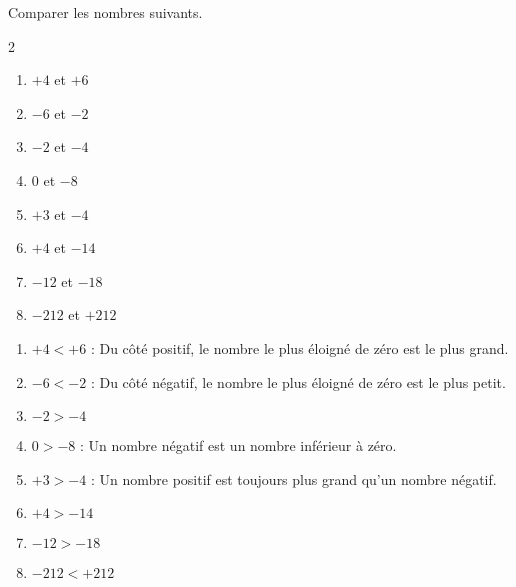 \begin{exercice*}
    Comparer les nombres suivants.
    \begin{multicols}2
        \begin{enumerate}
            \item $+4$ et $+6$
            \item $-6$ et $-2$
            \item $-2$ et $-4$
            \item $0$ et $-8$
            \item $+3$ et $-4$
            \item $+4$ et $-14$
            \item $-12$ et $-18$
            \item $-212$ et $+212$
        \end{enumerate}
    \end{multicols}
\end{exercice*}
\begin{corrige}
    \phantom{rrr}    
    
    \begin{enumerate}
        \item $+4<+6$ : Du côté positif, le nombre le plus éloigné de zéro est le plus grand.
        \item $-6<-2$ : Du côté négatif, le nombre le plus éloigné de zéro est le plus petit.
        \item $-2>-4$
        \item $0>-8$ : Un nombre négatif est un nombre inférieur à zéro.
        \item $+3>-4$ : Un nombre positif est toujours plus grand qu'un nombre négatif.
        \item $+4>-14$
        \item $-12>-18$
        \item $-212<+212$
    \end{enumerate}    
\end{corrige}

